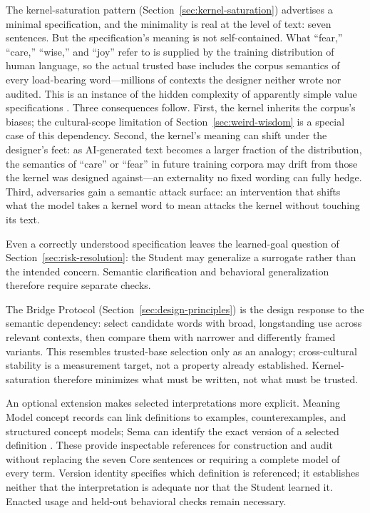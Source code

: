 \documentclass[11pt]{article}
\begin{document}
The kernel-saturation pattern (Section~\ref{sec:kernel-saturation}) advertises a minimal specification, and the minimality is real at the level of text: seven sentences. But the specification's meaning is not self-contained. What ``fear,'' ``care,'' ``wise,'' and ``joy'' refer to is supplied by the training distribution of human language, so the actual trusted base includes the corpus semantics of every load-bearing word---millions of contexts the designer neither wrote nor audited. This is an instance of the hidden complexity of apparently simple value specifications \cite{yudkowsky2007wishes}. Three consequences follow. First, the kernel inherits the corpus's biases; the cultural-scope limitation of Section~\ref{sec:weird-wisdom} is a special case of this dependency. Second, the kernel's meaning can shift under the designer's feet: as AI-generated text becomes a larger fraction of the distribution, the semantics of ``care'' or ``fear'' in future training corpora may drift from those the kernel was designed against---an externality no fixed wording can fully hedge. Third, adversaries gain a semantic attack surface: an intervention that shifts what the model takes a kernel word to mean attacks the kernel without touching its text.

Even a correctly understood specification leaves the learned-goal question
of Section~\ref{sec:risk-resolution}: the Student may generalize a surrogate
rather than the intended concern. Semantic clarification and behavioral
generalization therefore require separate checks.

The Bridge Protocol (Section~\ref{sec:design-principles}) is the design response
to the semantic dependency: select candidate words with broad, longstanding use across relevant contexts,
then compare them with narrower and differently framed variants. This resembles
trusted-base selection only as an analogy; cross-cultural stability is a
measurement target, not a property already established. Kernel-saturation
therefore minimizes what must be written, not what must be trusted.

An optional extension makes selected interpretations more explicit. Meaning
Model concept records can link definitions to examples, counterexamples, and
structured concept models; Sema can identify the exact version of a selected
definition \cite{westerbergMeaning2026,westerberg2026sema}. These provide
inspectable references for construction and audit without replacing the seven
Core sentences or requiring a complete model of every term. Version identity
specifies which definition is referenced; it establishes neither that the
interpretation is adequate nor that the Student learned it. Enacted usage and
held-out behavioral checks remain necessary.
\end{document}
